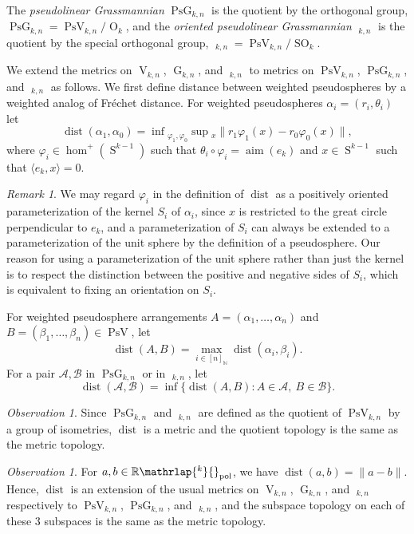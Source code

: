 \documentclass[JEP,XML,SOM,Unicode,NoFloatCountersInSection,published]{cedram}
\theoremstyle{remark}
\newtheorem{remark}[theorem]{Remark}
\newtheorem{observation}[theorem]{Observation}
\let\mc\mathcal
\let\mb\mathbb
\let\df\emph
\let\phi\varphi
\DeclareMathOperator{\dist}{dist}
\DeclareMathOperator{\pg}{PsG}
\DeclareMathOperator{\pog}{Ps\widetilde G}
\DeclareMathOperator{\g}{G}
\DeclareMathOperator{\oG}{\widetilde G}
\DeclareMathOperator{\orth}{O}
\DeclareMathOperator{\sorth}{SO}
\DeclareMathOperator{\stief}{V}
\DeclareMathOperator{\pstief}{PsV}
\DeclareMathOperator{\sphere}{S}
\newcommand{\Rpol}[1]{\mb{R}\mathrlap{{}^{#1}}{}_\text{pol}}
\DeclareMathOperator{\aim}{aim}
\begin{document}
The \df{pseudolinear Grassmannian} $\pg_{k,n}$ is the quotient by the orthogonal group, $\pg_{k,n} = \pstief_{k,n} / \orth_k$, and the \df{oriented pseudolinear Grassmannian} $\pog_{k,n}$ is the quotient by the special orthogonal group, $\pog_{k,n} = \pstief_{k,n} / \sorth_k$.

We extend the metrics on $\stief_{k,n}$, $\g_{k,n}$, and $\oG_{k,n}$ to metrics on $\pstief_{k,n}$, $\pg_{k,n}$, and $\pog_{k,n}$ as follows.
We first define distance between weighted pseudospheres by a weighted analog of Fréchet distance.
For weighted pseudospheres $\alpha_i = (r_i,\theta_i)$ let
\[ \dist(\alpha_1,\alpha_0) = \inf{}_{\phi_1, \phi_0} \sup{}_{x}\| r_1 \phi_1(x) - r_0 \phi_0(x)\|, \]
where $ \phi_i \in \hom^+(\sphere^{k-1})$ such that $\theta_i \circ \phi_i = \aim(e_k)$
and $x \in \sphere^{k-1}$ such that $\langle e_k, x\rangle = 0$.

\begin{remark}
We may regard $\phi_i$ in the definition of $\dist$ as a positively oriented parameterization of the kernel $S_{i}$ of $\alpha_i$,
since $x$ is restricted to the great circle perpendicular to $e_k$,
and a parameterization of $S_i$ can always be extended to a param\-eterization of the unit sphere by the definition of a pseudosphere.
Our reason for using a parameterization of the unit sphere rather than just the kernel is to respect the distinction between the positive and negative sides of $S_i$, which is equivalent to fixing an orientation on $S_i$.
\end{remark}

For weighted pseudosphere arrangements ${A} = (\alpha_1,\dots,\alpha_n)$ and ${B} = (\beta_1,\dots,\beta_n) \in \pstief$, let
\[ \dist({A},{B}) = \max_{i\in [n]_{\mb{N}}} \dist(\alpha_i,\beta_i). \]
For a pair $\mc{A},\mc{B}$ in $\pg_{k,n}$ or in $\pog_{k,n}$, let
\[ \dist(\mc{A},\mc{B}) = \inf\{ \dist(A,B):A \in \mc{A},\ B \in \mc{B} \}. \]

\begin{observation}
Since $\pg_{k,n}$ and $\pog_{k,n}$ are defined as the quotient of $\pstief_{k,n}$ by a group of isometries, $\dist$ is a metric and the quotient topology is the same as the metric topology.
\end{observation}

\begin{observation}
For $a,b \in \Rpol{k}$, we have $\dist(a,b) = \|a-b\|$. Hence, $\dist$ is an extension of the usual metrics on $\stief_{k,n}$, $\g_{k,n}$, and $\oG_{k,n}$ respectively to $\pstief_{k,n}$, $\pg_{k,n}$, and $\pog_{k,n}$, and the subspace topology on each of these $3$ subspaces is the same as the metric topology.
\end{observation}
\end{document}
